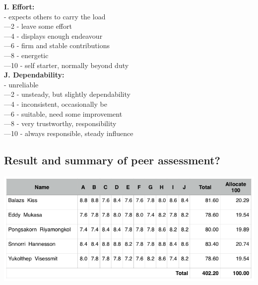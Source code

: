 \documentclass[11pt]{article}
\begin{document}
\textbf{I. Effort:}\\
	\indent{}	- expects others to carry the load\\
	\indent{}—2	- leave some effort\\
	\indent{}—4	- displays enough endeavour\\
	\indent{}—6	- firm and stable contributions\\
	\indent{}—8	- energetic\\
	\indent{}—10	- self starter, normally beyond duty\\

\textbf{J. Dependability:}\\ 
	\indent{}	- unreliable\\
	\indent{}—2	- unsteady, but slightly dependability \\
	\indent{}—4	- inconsistent, occasionally be\\
	\indent{}—6	- suitable, need some improvement \\
	\indent{}—8	- very trustworthy, responsibility \\
	\indent{}—10	- always responsible, steady influence \\

\subsection{Result and summary of peer assessment?}
\begin{center}			
\includegraphics[scale = 0.5]{Figure04}
\end{center}

\newpage	




\newpage	

\appendix


\end{document}
